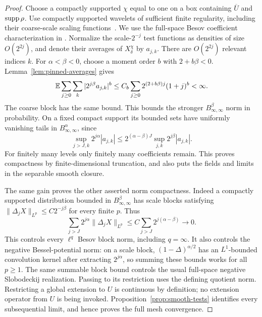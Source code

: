 \begin{proof}
Choose a compactly supported \(\chi\) equal to one on a box containing
\(\overline U\) and \(\operatorname{supp}\rho\). Use compactly supported wavelets of
sufficient finite regularity, including their coarse-scale scaling
functions~\cite[Section~4.C]{Daubechies1988}. We use the full-space
Besov coefficient characterization in
\cite[Proposition~2.3]{HairerLabbe2017}. Normalize the scale-\(2^{-j}\) test functions as densities
of size \(O(2^{2j})\), and denote their averages of \(X_\delta^\chi\)
by \(a_{j,k}\). There are \(O(2^{2j})\) relevant indices \(k\).
For \(\alpha<\beta<0\), choose a moment order \(b\) with
\(2+b\beta<0\). Lemma~\ref{lem:pinned-averages} gives
\begin{equation}\label{eq:prob-wavelet-sum}
 \mathbb E\sum_{j\ge0}\sum_k|2^{j\beta}a_{j,k}|^b
 \le C_b\sum_{j\ge0}2^{(2+b\beta)j}(1+j)^b<\infty.
\end{equation}
The coarse block has the same bound. This bounds the stronger
\(B^\beta_{\infty,\infty}\) norm in probability. On a fixed compact
support its bounded sets have uniformly vanishing tails in
\(B^\alpha_{\infty,\infty}\), since
\[
 \sup_{j>J,k}2^{j\alpha}|a_{j,k}|
 \le 2^{(\alpha-\beta)J}
          \sup_{j,k}2^{j\beta}|a_{j,k}|.
\]
For finitely many levels only finitely many coefficients remain.
This proves compactness by finite-dimensional truncation, and also puts
the fields and limits in the separable smooth closure.

The same gain proves the other asserted norm compactness. Indeed a
compactly supported distribution bounded in \(B^\beta_{\infty,\infty}\)
has scale blocks satisfying
\(\|\Delta_j X\|_{L^p}\le C2^{-j\beta}\) for every finite \(p\).
Thus
\[
 \sum_{j>J}2^{j\alpha}\|\Delta_jX\|_{L^p}
 \le C\sum_{j>J}2^{j(\alpha-\beta)}\longrightarrow0.
\]
This controls every \(\ell^q\) Besov block norm, including \(q=\infty\).
It also controls the negative Bessel-potential norm: on a scale block,
\((1-\Delta)^{\alpha/2}\) has an \(L^1\)-bounded convolution kernel
after extracting \(2^{j\alpha}\), so summing these bounds works for
all \(p\ge1\). The same summable block bound controls the usual
full-space negative Slobodeckij realization. Passing to its restriction
uses the defining quotient norm. Restricting a global extension to
\(U\) is continuous by definition; no extension operator from \(U\) is
being invoked. Proposition~\ref{prop:smooth-tests} identifies every
subsequential limit, and hence proves the full mesh convergence.


\end{proof}
